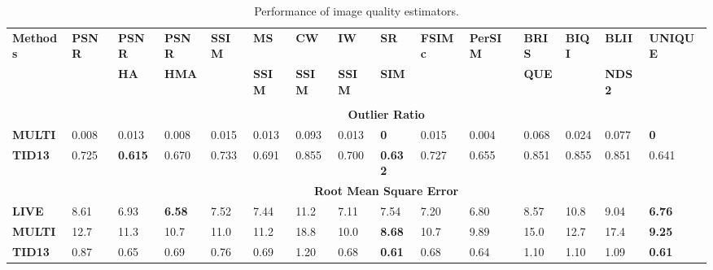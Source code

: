\documentclass[draftcls,12pt, onecolumn]{IEEEtran}
\begin{document}
\begin{center}
\begin{table*}[htbp!]
\scriptsize
\centering
\caption{Performance of image quality estimators.}
\label{tab_results_databases}
\vspace{-2.0mm}
\begin{tabular}{p{0.9cm}|p{0.63cm}|p{0.63cm}|p{0.63cm}|p{0.63cm}|p{0.63cm}|p{0.63cm}|p{0.63cm}|p{0.60cm}|p{0.75cm}|p{0.75cm}|p{0.63cm}|p{0.63cm}|p{0.63cm}|p{0.9cm}}
\hline


\multirow{3}{*}{{\bf Methods}}                & \multirow{2}{*}{{\bf PSNR}}  & {\bf PSNR } &{\bf PSNR } &\multirow{2}{*}{{\bf SSIM }} &{\bf MS } &{\bf CW }&{\bf IW } &{\bf SR }   &\multirow{2}{*}{{\bf FSIMc }} &\multirow{2}{*}{{\bf PerSIM }}&{\bf BRIS } & \multirow{2}{*}{{\bf BIQI}} &{\bf BLII } &\multirow{2}{*}{{\bf UNIQUE }}  \\
& &\textbf{HA} &\textbf{HMA} & &{\bf SSIM } &{\bf SSIM } &{\bf SSIM } &{\bf SIM }  &&&\bf QUE & &\bf NDS2 & \\ & &\cite{Ponomarenko2011} & \cite{Ponomarenko2011} &\cite{wang2004image} &\cite{Wang2003} &\cite{Sampat2009}&\cite{Wang2011}&\cite{Zhang12} &\cite{Zhang2011}&\cite{Temel2015}&\cite{Mittal2012} &\cite{Moorthy2010} &\cite{Saad2012}&
\\ \hline 
               
         
                & \multicolumn{14}{c}{\textbf{Outlier Ratio}}                                                                                                                                                                        \\ \hline

\textbf{MULTI}  
       &0.008   & 0.013  &  0.008   & 0.015  & 0.013    &0.093  & 0.013        &\bf  0   & 0.015   & 0.004    &0.068  & 0.024 &0.077 & \bf  0
 \\ 
\textbf{TID13}   
  &0.725   & \bf 0.615   & 0.670  &  0.733  &  0.691 &    0.855 &    0.700 & \bf   0.632 &    0.727 &    0.655  &0.851 &0.855 &0.851  &   0.641
\\ \hline                         
               
               
                & \multicolumn{14}{c}{\textbf{Root Mean Square Error}}                                                                                                                                                                        \\ \hline
\textbf{LIVE}  &8.61   & 6.93   & \bf 6.58  &  7.52  &  7.44 &  11.2 &   7.11 &   7.54 &   7.20 &   6.80  &8.57  &10.8 & 9.04  &\bf 6.76 \\ 
\textbf{MULTI}    &12.7  & 11.3 &  10.7  & 11.0   &11.2 &  18.8 &  10.0 &  \bf  8.68 &  10.7 &   9.89  &15.0 &12.7 &17.4 &\bf 9.25
 \\ 
\textbf{TID13}     &0.87   & 0.65  &  0.69 &   0.76 &   0.69  &  1.20  &  0.68 &  \bf 0.61  &  0.68 &   0.64 &1.10 & 1.10 &1.09 &   \bf 0.61
            \\ \hline              
               

\end{tabular}
\end{table*}
\end{center}
\end{document}
